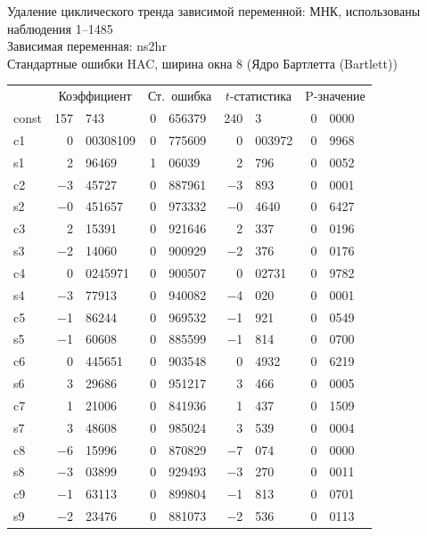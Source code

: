 \documentclass[a4paper,12pt]{article}
\begin{document}
\begin{table}[H]
\begin{center}
	
	Удаление циклического тренда зависимой переменной: МНК, использованы наблюдения 1--1485\\
	Зависимая переменная: ns2hr\\
	Стандартные ошибки HAC, ширина окна 8 (Ядро Бартлетта (Bartlett))
	
	\vspace{1em}
	
	\begin{tabular}{lr@{,}lr@{,}lr@{,}lr@{,}l}
		&
		\multicolumn{2}{c}{Коэффициент} &
		\multicolumn{2}{c}{Ст.\ ошибка} &
		\multicolumn{2}{c}{$t$-статистика} &
		\multicolumn{2}{c}{P-значение} \\[1ex]
		const &		157&743 &		0&656379 &		240&3 &		0&0000 \\
		c1 &		0&00308109 &		0&775609 &		0&003972 &		0&9968 \\
		s1 &		2&96469 &		1&06039 &		2&796 &		0&0052 \\
		c2 &		$-$3&45727 &		0&887961 &		$-$3&893 &		0&0001 \\
		s2 &		$-$0&451657 &		0&973332 &		$-$0&4640 &		0&6427 \\
		c3 &		2&15391 &		0&921646 &		2&337 &		0&0196 \\
		s3 &		$-$2&14060 &		0&900929 &		$-$2&376 &		0&0176 \\
		c4 &		0&0245971 &		0&900507 &		0&02731 &		0&9782 \\
		s4 &		$-$3&77913 &		0&940082 &		$-$4&020 &		0&0001 \\
		c5 &		$-$1&86244 &		0&969532 &		$-$1&921 &		0&0549 \\
		s5 &		$-$1&60608 &		0&885599 &		$-$1&814 &		0&0700 \\
		c6 &		0&445651 &		0&903548 &		0&4932 &		0&6219 \\
		s6 &		3&29686 &		0&951217 &		3&466 &		0&0005 \\
		c7 &		1&21006 &		0&841936 &		1&437 &		0&1509 \\
		s7 &		3&48608 &		0&985024 &		3&539 &		0&0004 \\
		c8 &		$-$6&15996 &		0&870829 &		$-$7&074 &		0&0000 \\
		s8 &		$-$3&03899 &		0&929493 &		$-$3&270 &		0&0011 \\
		c9 &		$-$1&63113 &		0&899804 &		$-$1&813 &		0&0701 \\
		s9 &		$-$2&23476 &		0&881073 &		$-$2&536 &		0&0113 \\

\end{tabular}
\end{center}
\end{table}
\end{document}
